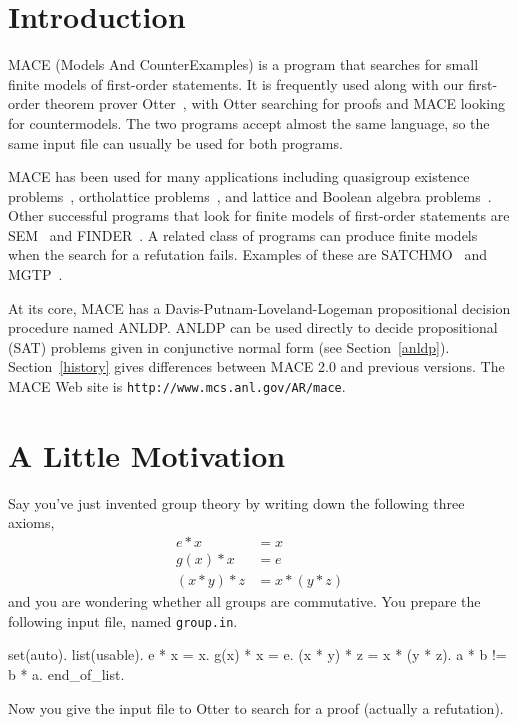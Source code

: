 \documentclass[11pt]{article}
\begin{document}
\section{Introduction}

MACE (Models And CounterExamples) is a program that searches
for small finite models of first-order statements.
It is frequently used along with our first-order theorem prover
Otter~\cite{otter3,otter-web}, with Otter searching for
proofs and MACE looking for countermodels.  The two programs
accept almost the same language, so the same input file can
usually be used for both programs.

MACE has been used for many applications including quasigroup existence
problems~\cite{dp-quasi}, ortholattice problems~\cite{ortholattice}, and
lattice and Boolean algebra problems~\cite{wm-rp:monograph,monograph-web}.
Other successful programs that look for finite models of first-order
statements are SEM~\cite{sem} and FINDER~\cite{finder}.
A related class of programs can produce finite models when the
search for a refutation fails.  Examples of these are
SATCHMO~\cite{satchmo} and MGTP~\cite{mgtp}.

At its core, MACE has a Davis-Putnam-Loveland-Logeman propositional
decision procedure named ANLDP.  ANLDP can be used directly to decide
propositional (SAT) problems given in conjunctive normal form
(see Section~\ref{anldp}).
Section~\ref{history} gives differences between
MACE 2.0 and previous versions.
The MACE Web site is \texttt{http://www.mcs.anl.gov/AR/mace}.

\section{A Little Motivation}

Say you've just invented group theory by writing down
the following three axioms,
\begin{align*}
e * x & = x\\
g(x) * x & = e\\
(x * y) * z & = x * (y * z)
\end{align*}
and you are wondering whether all groups are commutative.
You prepare the following input file, named \texttt{group.in}.
\begin{center}
\begin{small}
\begin{boxedverbatim}
set(auto).
list(usable).
  e * x = x.                  %
  g(x) * x = e.               %
  (x * y) * z = x * (y * z).  %
  a * b != b * a.             %
end_of_list.
\end{boxedverbatim}
\end{small}
\end{center}
\noindent
Now you give the input file to Otter to search for a proof
(actually a refutation).
\end{document}
